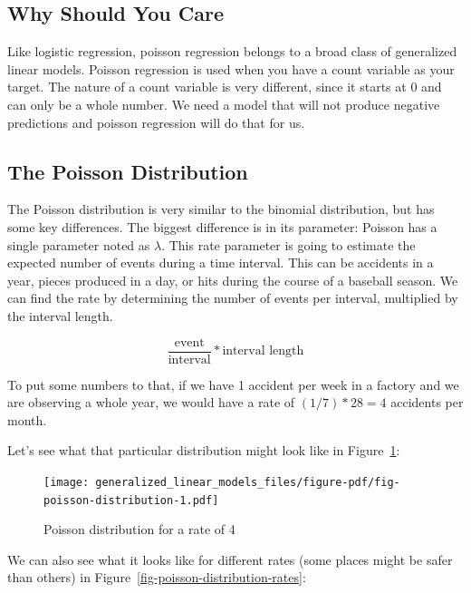 \documentclass[
  letterpaper,
]{krantz}
\begin{document}
\subsection{Why Should You Care}\label{sec-glm-poisson-why}

Like logistic regression, poisson regression belongs to a broad class of
generalized linear models. Poisson regression is used when you have a
count variable as your target. The nature of a count variable is very
different, since it starts at 0 and can only be a whole number. We need
a model that will not produce negative predictions and poisson
regression will do that for us.

\subsection{The Poisson
Distribution}\label{sec-glm-poisson-distribution}

The Poisson distribution is very similar to the binomial distribution,
but has some key differences. The biggest difference is in its
parameter: Poisson has a single parameter noted as \(\lambda\). This
rate parameter is going to estimate the expected number of events during
a time interval. This can be accidents in a year, pieces produced in a
day, or hits during the course of a baseball season. We can find the
rate by determining the number of events per interval, multiplied by the
interval length.

\[\frac{\text{event}}{\text{interval}}*\text{interval length} \]

To put some numbers to that, if we have 1 accident per week in a factory
and we are observing a whole year, we would have a rate of
\((1 / 7) * 28 = 4\) accidents per month.

Let's see what that particular distribution might look like in
Figure~\ref{fig-poisson-distribution}:

\begin{figure}

{\centering \texttt{[image: generalized\_linear\_models\_files/figure-pdf/fig-poisson-distribution-1.pdf]}

}

\caption{\label{fig-poisson-distribution}Poisson distribution for a rate
of 4}

\end{figure}

We can also see what it looks like for different rates (some places
might be safer than others) in
Figure~\ref{fig-poisson-distribution-rates}:
\end{document}
